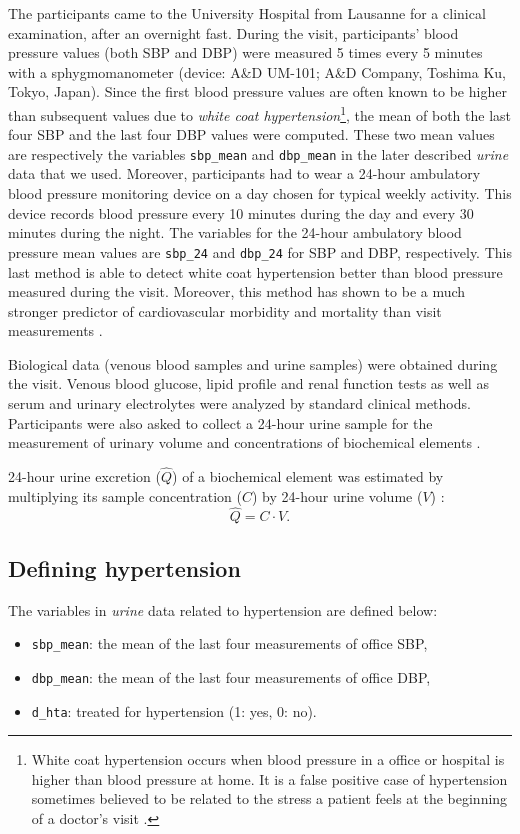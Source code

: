 The participants came to the University Hospital from Lausanne for a clinical examination, after an overnight fast. During the visit, participants' blood pressure values (both SBP and DBP) were measured 5 times every 5 minutes with a sphygmomanometer (device: A\&D UM-101; A\&D Company, Toshima Ku, Tokyo, Japan). Since the first blood pressure values are often known to be higher than subsequent values due to \emph{white coat hypertension}\footnote{White coat hypertension occurs when blood pressure in a office or hospital is higher than blood pressure at home. It is a false positive case of hypertension sometimes believed to be related to the stress a patient feels at the beginning of a doctor's visit \cite{kasper_harrisons_2015}.}, the mean of both the last four SBP and the last four DBP values were computed. These two mean values are respectively the variables \texttt{sbp\_mean} and \texttt{dbp\_mean} in the later described \emph{urine} data that we used. Moreover, participants had to wear a 24-hour ambulatory blood pressure monitoring device on a day chosen for typical weekly activity. This device records blood pressure every 10 minutes during the day and every 30 minutes during the night. The variables for the 24-hour ambulatory blood pressure mean values are \texttt{sbp\_24} and \texttt{dbp\_24} for SBP and DBP, respectively. This last method is able to detect white coat hypertension better than blood pressure measured during the visit. Moreover, this method has shown to be a much stronger predictor of cardiovascular morbidity and mortality than visit measurements \cite{obrien_european_2013}.

Biological data (venous blood samples and urine samples) were obtained during the visit. Venous blood glucose, lipid profile and renal function tests as well as serum and urinary electrolytes were analyzed by standard clinical methods. Participants were also asked to collect a 24-hour urine sample for the measurement of urinary volume and concentrations of biochemical elements \cite{alwan_epidemiology_2014}.

24-hour urine excretion ($\hat{Q}$) of a biochemical element was estimated by multiplying its sample concentration ($C$) by 24-hour urine volume ($V$) :
\begin{equation*}
\hat{Q} = C \cdot V.
\end{equation*}

\subsection{Defining hypertension}
The variables in \emph{urine} data related to hypertension are defined below:
\begin{itemize}
\item \texttt{sbp\_mean}: the mean of the last four measurements of office SBP,
\item \texttt{dbp\_mean}: the mean of the last four measurements of office DBP,
\item \texttt{d\_hta}: treated for hypertension (1: yes, 0: no).
\end{itemize}

